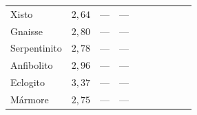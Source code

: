 \documentclass[10pt]{beamer} %
\begin{document}
\begin{frame}
\begin{scriptsize}
\begin{table}[H]
\begin{tabular}{@{}llllllllll@{}}
				Xisto &   $2,64$    &         ---      &      ---      &    \\
				Gnaisse &    $2,80$     &      ---         &    ---        &        \\
				Serpentinito &    $2,78$     &   ---            &   ---     &        \\
				Anfibolito &  $2,96$       &          ---     &       ---     &        \\
				Eclogito &  $3,37$    &       ---        &      ---      &    \\
				Mármore &   $2,75$       &      ---         &     ---       &      \\ \bottomrule
			\end{tabular}
	\end{table}
\end{scriptsize}
\end{frame}
\end{document}
